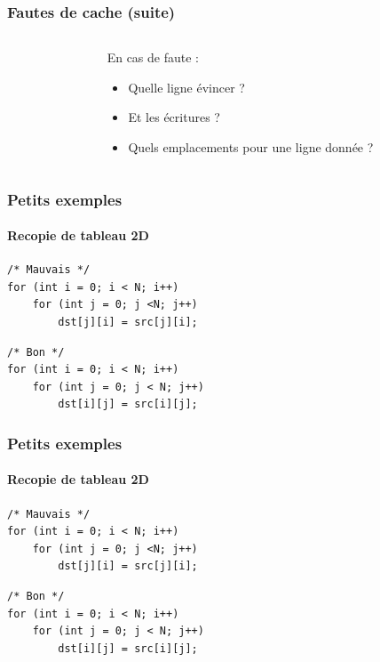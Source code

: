 \documentclass[xcolor={x11names,svgnames}, 14pt]{beamer}
\begin{document}
\begin{frame}[label=cache_organization]
\frametitle{Fautes de cache (suite)}

\begin{columns}
  \begin{column}{2cm}
  \end{column}
  \begin{column}{7cm}
    En cas de faute :
    \begin{itemize}
    \item Quelle ligne évincer ?
    \item Et les écritures ?
    \item Quels emplacements pour une ligne donnée ?      
    \end{itemize}
  \end{column}
\end{columns}
\end{frame}


\begin{frame}[label=applications,fragile]
\frametitle{Petits exemples}
\framesubtitle{Recopie de tableau 2D}

\begin{verbatim}
/* Mauvais */
for (int i = 0; i < N; i++)
    for (int j = 0; j <N; j++)
        dst[j][i] = src[j][i];
\end{verbatim}

\bigskip

\begin{verbatim}
/* Bon */
for (int i = 0; i < N; i++)
    for (int j = 0; j < N; j++)
        dst[i][j] = src[i][j];
\end{verbatim}
\end{frame}


\begin{frame}[label=applications,fragile]
\frametitle{Petits exemples}
\framesubtitle{Recopie de tableau 2D}

\begin{verbatim}
/* Mauvais */
for (int i = 0; i < N; i++)
    for (int j = 0; j <N; j++)
        dst[j][i] = src[j][i];
\end{verbatim}

\bigskip

\begin{verbatim}
/* Bon */
for (int i = 0; i < N; i++)
    for (int j = 0; j < N; j++)
        dst[i][j] = src[i][j];
\end{verbatim}
\end{frame}
\end{document}
